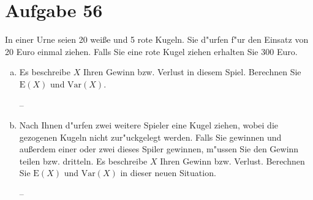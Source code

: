 \section{Aufgabe 56}

In einer Urne seien 20 wei{\ss}e und 5 rote Kugeln. Sie d"urfen f"ur den
Einsatz von 20 Euro einmal ziehen. Falls Sie eine rote Kugel ziehen erhalten
Sie 300 Euro.
\begin{enumerate}[(a)]
    \item Es beschreibe $X$ Ihren Gewinn bzw. Verlust in diesem Spiel.
        Berechnen Sie $\text{E}(X)$ und $\text{Var}(X)$.

        --
    \item Nach Ihnen d"urfen zwei weitere Spieler eine Kugel ziehen, wobei die
        gezogenen Kugeln nicht zur"uckgelegt werden. Falls Sie gewinnen und
        au{\ss}erdem einer oder zwei dieses Spiler gewinnen, m"ussen Sie den
        Gewinn teilen bzw. dritteln. Es beschreibe $X$ Ihren Gewinn bzw. Verlust.
        Berechnen Sie $\text{E}(X)$ und $\text{Var}(X)$ in dieser neuen Situation.

        --
\end{enumerate}
